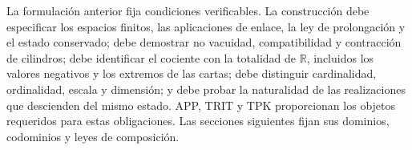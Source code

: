 La formulaci\'on anterior fija condiciones verificables. La construcci\'on
debe especificar los espacios finitos, las aplicaciones de enlace, la ley de
prolongaci\'on y el estado conservado; debe demostrar no vacuidad,
compatibilidad y contracci\'on de cilindros; debe identificar el cociente con
la totalidad de \(\mathbb R\), incluidos los valores negativos y los
extremos de las cartas; debe distinguir cardinalidad, ordinalidad, escala y
dimensi\'on; y debe probar la naturalidad de las realizaciones que descienden
del mismo estado. APP, TRIT y TPK proporcionan los objetos requeridos para
estas obligaciones. Las secciones siguientes fijan sus dominios,
codominios y leyes de composici\'on.
